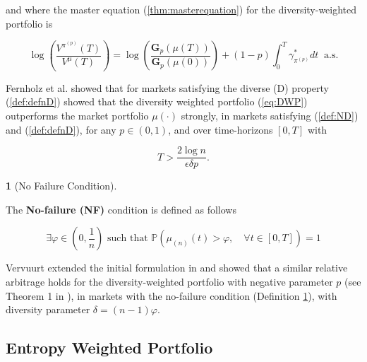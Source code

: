 \documentclass[british]{amsart}
\numberwithin{equation}{section}
\numberwithin{figure}{section}
\theoremstyle{plain}
\theoremstyle{definition}
\newtheorem{defn}[thm]{\protect\definitionname}
\theoremstyle{plain}
\theoremstyle{plain}
\theoremstyle{plain}
\theoremstyle{remark}
\theoremstyle{plain}
\providecommand{\definitionname}{Definition}
\newcommand{\measure}{\mathbb{P}}
\begin{document}
and where the master equation (\ref{thm:masterequation}) for the
diversity-weighted portfolio is

  \begin{equation}
\log\left(\frac{V^{\pi^{(p)}}(T)}{V^{\mu}(T)}\right)=\log\left(\frac{\mathbf{G}_{p}(\mu(T))}{\mathbf{G}_{p}(\mu(0))}\right)+(1-p)\int_{0}^{T}\gamma_{\pi^{(p)}}^{*}dt\;\;\text{a.s.}
\end{equation}

Fernholz et al. \cite{Fernholz2005a} showed that for markets satisfying the
diverse (D) property (\ref{def:defnD}) showed that the diversity weighted
portfolio (\ref{eq:DWP}) outperforms the market portfolio $\mu(\cdot)$ strongly,
in markets satisfying (\ref{def:ND}) and (\ref{def:defnD}), for any $p\in(0,1)$,
and over time-horizons $[0,T]$ with 

\begin{equation} T>\frac{2\log n}{\epsilon\delta p}. \end{equation}

\begin{defn} [No Failure Condition] \label{def:NF}

The \textbf{No-failure (NF) }condition is defined as follows

  \begin{equation} \exists\varphi\in(0,\frac{1}{n}) \text{ such that } \measure
\left( \mu_{(n)}(t) > \varphi, \quad \forall t\in[0,T] \right) = 1
\end{equation}

\end{defn}

Vervuurt extended the initial formulation in \cite{vervuurt2015} and showed that
a similar relative arbitrage holds for the diversity-weighted portfolio with
negative parameter $p$ (see Theorem 1 in \cite{vervuurt2015}), in markets with
the no-failure condition (Definition \ref{def:NF}), with diversity parameter
$\delta=(n-1)\varphi$.

\newpage

\subsection{Entropy Weighted Portfolio}
\end{document}
